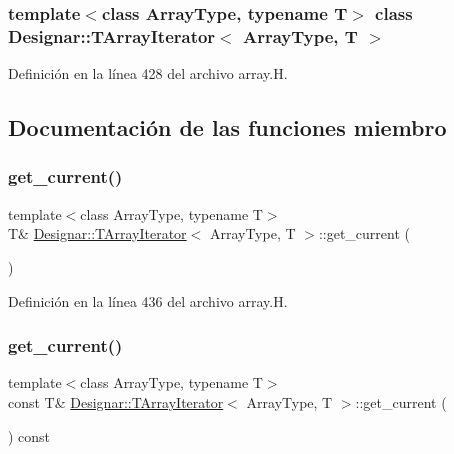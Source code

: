 \subsubsection*{template$<$class Array\+Type, typename T$>$\newline
class Designar\+::\+T\+Array\+Iterator$<$ Array\+Type, T $>$}



Definición en la línea 428 del archivo array.\+H.



\subsection{Documentación de las funciones miembro}
\mbox{\label{class_designar_1_1_t_array_iterator_a1d627df3d5e97047d904e743ccab0731}} 
\subsubsection{\texorpdfstring{get\+\_\+current()}{get\_current()}\hspace{0.1cm}{\footnotesize\ttfamily [1/2]}}
{\footnotesize\ttfamily template$<$class Array\+Type, typename T$>$ \\
T\& \hyperlink{class_designar_1_1_t_array_iterator}{Designar\+::\+T\+Array\+Iterator}$<$ Array\+Type, T $>$\+::get\+\_\+current (\begin{DoxyParamCaption}{ }\end{DoxyParamCaption})\hspace{0.3cm}{\ttfamily [inline]}}



Definición en la línea 436 del archivo array.\+H.

\mbox{\label{class_designar_1_1_t_array_iterator_ab7f3127bd70958a362a18f91a199a72b}} 
\subsubsection{\texorpdfstring{get\+\_\+current()}{get\_current()}\hspace{0.1cm}{\footnotesize\ttfamily [2/2]}}
{\footnotesize\ttfamily template$<$class Array\+Type, typename T$>$ \\
const T\& \hyperlink{class_designar_1_1_t_array_iterator}{Designar\+::\+T\+Array\+Iterator}$<$ Array\+Type, T $>$\+::get\+\_\+current (\begin{DoxyParamCaption}{ }\end{DoxyParamCaption}) const\hspace{0.3cm}{\ttfamily [inline]}}



